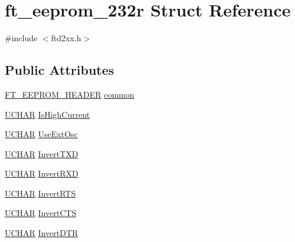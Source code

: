 \hypertarget{structft__eeprom__232r}{}\section{ft\+\_\+eeprom\+\_\+232r Struct Reference}
\label{structft__eeprom__232r}


{\ttfamily \#include $<$ftd2xx.\+h$>$}

\subsection*{Public Attributes}
\begin{DoxyCompactItemize}
\item 
\hyperlink{LALUsbMLx64_2include_2ftd2xx_8h_ad5a6f519cd67a403fd8742756462394e}{F\+T\+\_\+\+E\+E\+P\+R\+O\+M\+\_\+\+H\+E\+A\+D\+ER} \hyperlink{structft__eeprom__232r_a04ed9a15b88229df4567d6c9ccd6c99d}{common}
\item 
\hyperlink{CatCaloProto40MHz_2inc_2WinTypes_8h_a4f4bb67531a9bf6f0b9c6ad76aeba587}{U\+C\+H\+AR} \hyperlink{structft__eeprom__232r_abd8a4afecd3fa431c7654d14886395dd}{Is\+High\+Current}
\item 
\hyperlink{CatCaloProto40MHz_2inc_2WinTypes_8h_a4f4bb67531a9bf6f0b9c6ad76aeba587}{U\+C\+H\+AR} \hyperlink{structft__eeprom__232r_af430c36e3ca675a6860463b70b963369}{Use\+Ext\+Osc}
\item 
\hyperlink{CatCaloProto40MHz_2inc_2WinTypes_8h_a4f4bb67531a9bf6f0b9c6ad76aeba587}{U\+C\+H\+AR} \hyperlink{structft__eeprom__232r_ae284d5a2e53c8e77dcbdd7789734b8f0}{Invert\+T\+XD}
\item 
\hyperlink{CatCaloProto40MHz_2inc_2WinTypes_8h_a4f4bb67531a9bf6f0b9c6ad76aeba587}{U\+C\+H\+AR} \hyperlink{structft__eeprom__232r_afbb26654eac5fa6266726e42f26ed317}{Invert\+R\+XD}
\item 
\hyperlink{CatCaloProto40MHz_2inc_2WinTypes_8h_a4f4bb67531a9bf6f0b9c6ad76aeba587}{U\+C\+H\+AR} \hyperlink{structft__eeprom__232r_accb739bb2d2c81f31cb9e7e634d15e7c}{Invert\+R\+TS}
\item 
\hyperlink{CatCaloProto40MHz_2inc_2WinTypes_8h_a4f4bb67531a9bf6f0b9c6ad76aeba587}{U\+C\+H\+AR} \hyperlink{structft__eeprom__232r_a95c9b6e2547151c62c36a981e3d121e6}{Invert\+C\+TS}
\item 
\hyperlink{CatCaloProto40MHz_2inc_2WinTypes_8h_a4f4bb67531a9bf6f0b9c6ad76aeba587}{U\+C\+H\+AR} \hyperlink{structft__eeprom__232r_a782d2b0ecc30bae4b3f967fc349f6808}{Invert\+D\+TR}
\item 

\end{DoxyCompactItemize}
